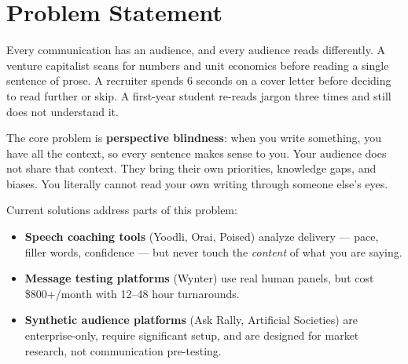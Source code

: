 \documentclass[a4paper, 11pt, twocolumn]{article}
\begin{document}

\section{Problem Statement}

Every communication has an audience, and every audience reads differently. A venture capitalist scans for numbers and unit economics before reading a single sentence of prose. A recruiter spends 6 seconds on a cover letter before deciding to read further or skip. A first-year student re-reads jargon three times and still does not understand it.

The core problem is \textbf{perspective blindness}: when you write something, you have all the context, so every sentence makes sense to you. Your audience does not share that context. They bring their own priorities, knowledge gaps, and biases. You literally cannot read your own writing through someone else's eyes.

Current solutions address parts of this problem:
\begin{itemize}[nosep, leftmargin=1.2em]
    \item \textbf{Speech coaching tools} (Yoodli, Orai, Poised) analyze delivery --- pace, filler words, confidence --- but never touch the \textit{content} of what you are saying.
    \item \textbf{Message testing platforms} (Wynter) use real human panels, but cost \$800+/month with 12--48 hour turnarounds.
    \item \textbf{Synthetic audience platforms} (Ask Rally, Artificial Societies) are enterprise-only, require significant setup, and are designed for market research, not communication pre-testing.
\end{itemize}
\end{document}
